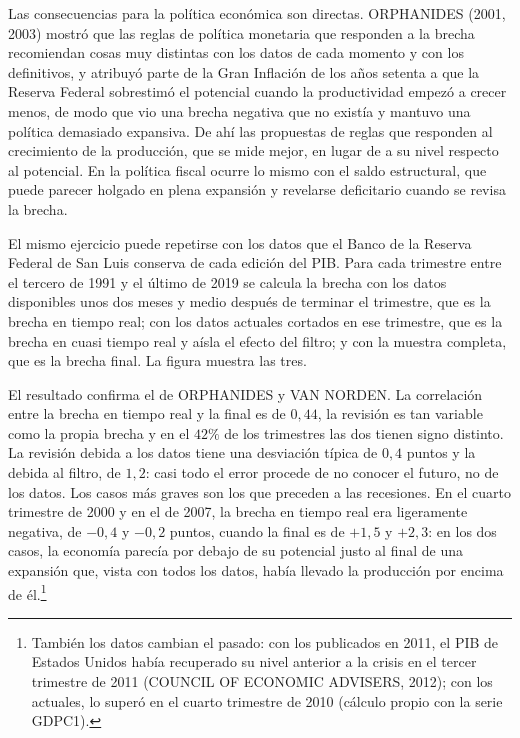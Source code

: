 \documentclass[10pt,a4paper]{article}
\begin{document}
Las consecuencias para la política económica son directas. ORPHANIDES (2001, 2003) mostró que las reglas de política monetaria que responden a la brecha recomiendan cosas muy distintas con los datos de cada momento y con los definitivos, y atribuyó parte de la Gran Inflación de los años setenta a que la Reserva Federal sobrestimó el potencial cuando la productividad empezó a crecer menos, de modo que vio una brecha negativa que no existía y mantuvo una política demasiado expansiva. De ahí las propuestas de reglas que responden al crecimiento de la producción, que se mide mejor, en lugar de a su nivel respecto al potencial. En la política fiscal ocurre lo mismo con el saldo estructural, que puede parecer holgado en plena expansión y revelarse deficitario cuando se revisa la brecha.

El mismo ejercicio puede repetirse con los datos que el Banco de la Reserva Federal de San Luis conserva de cada edición del PIB. Para cada trimestre entre el tercero de 1991 y el último de 2019 se calcula la brecha con los datos disponibles unos dos meses y medio después de terminar el trimestre, que es la brecha en tiempo real; con los datos actuales cortados en ese trimestre, que es la brecha en cuasi tiempo real y aísla el efecto del filtro; y con la muestra completa, que es la brecha final. La figura muestra las tres.

El resultado confirma el de ORPHANIDES y VAN NORDEN. La correlación entre la brecha en tiempo real y la final es de $0{,}44$, la revisión es tan variable como la propia brecha y en el $42\%$ de los trimestres las dos tienen signo distinto. La revisión debida a los datos tiene una desviación típica de $0{,}4$ puntos y la debida al filtro, de $1{,}2$: casi todo el error procede de no conocer el futuro, no de los datos. Los casos más graves son los que preceden a las recesiones. En el cuarto trimestre de 2000 y en el de 2007, la brecha en tiempo real era ligeramente negativa, de $-0{,}4$ y $-0{,}2$ puntos, cuando la final es de $+1{,}5$ y $+2{,}3$: en los dos casos, la economía parecía por debajo de su potencial justo al final de una expansión que, vista con todos los datos, había llevado la producción por encima de él.\footnote{%
    También los datos cambian el pasado: con los publicados en 2011, el PIB de Estados Unidos había recuperado su nivel anterior a la crisis en el tercer trimestre de 2011 (COUNCIL OF ECONOMIC ADVISERS, 2012); con los actuales, lo superó en el cuarto trimestre de 2010 (cálculo propio con la serie GDPC1).
}
\end{document}
